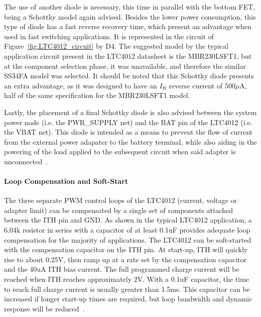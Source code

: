 The use of another diode is necessary, this time in parallel with the bottom FET, being a Schottky model again advised. Besides the lower power consumption, this type of diode has a fast reverse recovery time, which present an advantage when used in fast switching applications. It is represented in the circuit of Figure~\ref{fig:LTC4012_circuit} by D4. The suggested model by the typical application circuit present in the LTC4012 datasheet is the MBR230LSFT1, but at the component selection phase, it was unavailable, and therefore the similar SS34FA model was selected. It should be noted that this Schottky diode presents an extra advantage, as it was designed to have an $I_R$ reverse current of $500 \mu$A, half of the same specification for the MBR230LSFT1 model.

Lastly, the placement of a final Schottky diode is also advised between the system power node (i.e. the PWR\_SUPPLY net) and the BAT pin of the LTC4012 (i.e. the VBAT net). This diode is intended as a means to prevent the flow of current from the external power adapater to the battery terminal, while also aiding in the powering of the load applied to the subsequent circuit when said adapter is unconnected~\cite{LTC4012,CSD17308Q3}.

\paragraph{Loop Compensation and Soft-Start} %
The three separate PWM control loops of the LTC4012 (current, voltage or adapter limit) can be compensated by a single set of components attached between the ITH pin and GND. As shown in the typical LTC4012 application, a 6.04k resistor in series with a capacitor of at least 0.1uF provides adequate loop compensation for the majority of applications.
The LTC4012 can be soft-started with the compensation capacitor on the ITH pin. At start-up, ITH will quickly rise to about 0.25V, then ramp up at a rate set by the compensation capacitor and the 40uA ITH bias current.
The full programmed charge current will be reached when ITH reaches approximately 2V. With a 0.1uF capacitor, the time to reach full charge current is usually greater than 1.5ms.
This capacitor can be increased if longer start-up times are required, but loop bandwidth and dynamic response will be reduced~\cite{LTC4012}.


